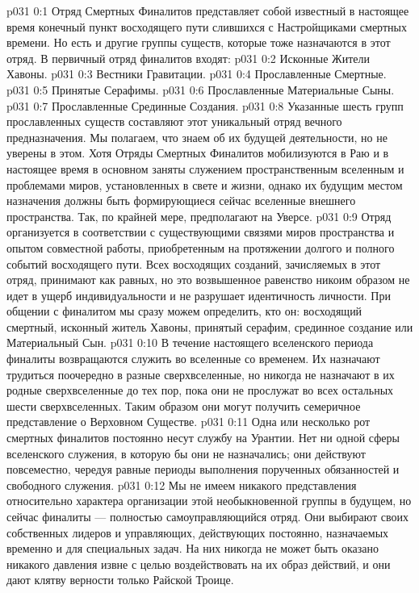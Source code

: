 \author{Божественный Советник и Не Имеющий Имени и Номера}
\vs p031 0:1 Отряд Смертных Финалитов представляет собой известный в настоящее время конечный пункт восходящего пути слившихся с Настройщиками смертных времени. Но есть и другие группы существ, которые тоже назначаются в этот отряд. В первичный отряд финалитов входят:
\vs p031 0:2 \bibnobreakspace Исконные Жители Хавоны.
\vs p031 0:3 \bibnobreakspace Вестники Гравитации.
\vs p031 0:4 \bibnobreakspace Прославленные Смертные.
\vs p031 0:5 \bibnobreakspace Принятые Серафимы.
\vs p031 0:6 \bibnobreakspace Прославленные Материальные Сыны.
\vs p031 0:7 \bibnobreakspace Прославленные Срединные Создания.
\vs p031 0:8 \pc Указанные шесть групп прославленных существ составляют этот уникальный отряд вечного предназначения. Мы полагаем, что знаем об их будущей деятельности, но не уверены в этом. Хотя Отряды Смертных Финалитов мобилизуются в Раю и в настоящее время в основном заняты служением пространственным вселенным и проблемами миров, установленных в свете и жизни, однако их будущим местом назначения должны быть формирующиеся сейчас вселенные внешнего пространства. Так, по крайней мере, предполагают на Уверсе.
\vs p031 0:9 Отряд организуется в соответствии с существующими связями миров пространства и опытом совместной работы, приобретенным на протяжении долгого и полного событий восходящего пути. Всех восходящих созданий, зачисляемых в этот отряд, принимают как равных, но это возвышенное равенство никоим образом не идет в ущерб индивидуальности и не разрушает идентичность личности. При общении с финалитом мы сразу можем определить, кто он: восходящий смертный, исконный житель Хавоны, принятый серафим, срединное создание или Материальный Сын.
\vs p031 0:10 В течение настоящего вселенского периода финалиты возвращаются служить во вселенные со временем. Их назначают трудиться поочередно в разные сверхвселенные, но никогда не назначают в их родные сверхвселенные до тех пор, пока они не прослужат во всех остальных шести сверхвселенных. Таким образом они могут получить семеричное представление о Верховном Существе.
\vs p031 0:11 Одна или несколько рот смертных финалитов постоянно несут службу на Урантии. Нет ни одной сферы вселенского служения, в которую бы они не назначались; они действуют повсеместно, чередуя равные периоды выполнения порученных обязанностей и свободного служения.
\vs p031 0:12 Мы не имеем никакого представления относительно характера организации этой необыкновенной группы в будущем, но сейчас финалиты --- полностью самоуправляющийся отряд. Они выбирают своих собственных лидеров и управляющих, действующих постоянно, назначаемых временно и для специальных задач. На них никогда не может быть оказано никакого давления извне с целью воздействовать на их образ действий, и они дают клятву верности только Райской Троице.
